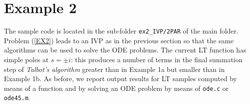 \documentclass[a4paper,10pt]{report}%
\begin{document}
\section{Example 2}
The sample code is located in the sub-folder {\tt ex2\_IVP/2PAR} of the main folder.
\\
Problem (\ref{EX2}) leads to an IVP as in the previous section so that the same algorithms can be used to solve
the ODE problems. The current LT function has simple poles at $s=\pm i$: this produces a number of terms in the
final summation step of {\em Talbot's algorithm} greater than in Example 1a but smaller than in Example 1b.
As before, we report output results for LT samples computed by means of a function and by solving an ODE problem
by means of {\tt ode.c} or {\tt ode45.m}.
\end{document}
